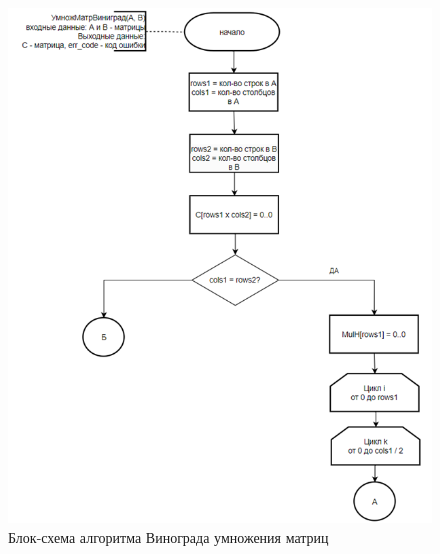 \begin{figure}[H]
    \centering
    \includegraphics[width=1.05\textwidth]{img/block_2_1.png}
    \caption{Блок-схема алгоритма Винограда умножения матриц}
    \label{fig:block_2_1}
\end{figure}

